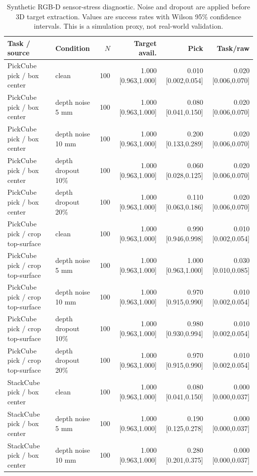 \begin{table}[t]
\centering
\caption{Synthetic RGB-D sensor-stress diagnostic. Noise and dropout are applied before 3D target extraction. Values are success rates with Wilson 95\% confidence intervals. This is a simulation proxy, not real-world validation.}
\label{tab:sensor-stress}
\small
\begin{tabular}{llrrrr}
\toprule
Task / source & Condition & $N$ & Target avail. & Pick & Task/raw \\
\midrule
PickCube pick / box center & clean & 100 & 1.000 [0.963,1.000] & 0.010 [0.002,0.054] & 0.020 [0.006,0.070] \\
PickCube pick / box center & depth noise 5 mm & 100 & 1.000 [0.963,1.000] & 0.080 [0.041,0.150] & 0.020 [0.006,0.070] \\
PickCube pick / box center & depth noise 10 mm & 100 & 1.000 [0.963,1.000] & 0.200 [0.133,0.289] & 0.020 [0.006,0.070] \\
PickCube pick / box center & depth dropout 10\% & 100 & 1.000 [0.963,1.000] & 0.060 [0.028,0.125] & 0.020 [0.006,0.070] \\
PickCube pick / box center & depth dropout 20\% & 100 & 1.000 [0.963,1.000] & 0.110 [0.063,0.186] & 0.020 [0.006,0.070] \\
\midrule
PickCube pick / crop top-surface & clean & 100 & 1.000 [0.963,1.000] & 0.990 [0.946,0.998] & 0.010 [0.002,0.054] \\
PickCube pick / crop top-surface & depth noise 5 mm & 100 & 1.000 [0.963,1.000] & 1.000 [0.963,1.000] & 0.030 [0.010,0.085] \\
PickCube pick / crop top-surface & depth noise 10 mm & 100 & 1.000 [0.963,1.000] & 0.970 [0.915,0.990] & 0.010 [0.002,0.054] \\
PickCube pick / crop top-surface & depth dropout 10\% & 100 & 1.000 [0.963,1.000] & 0.980 [0.930,0.994] & 0.010 [0.002,0.054] \\
PickCube pick / crop top-surface & depth dropout 20\% & 100 & 1.000 [0.963,1.000] & 0.970 [0.915,0.990] & 0.010 [0.002,0.054] \\
\midrule
StackCube pick / box center & clean & 100 & 1.000 [0.963,1.000] & 0.080 [0.041,0.150] & 0.000 [0.000,0.037] \\
StackCube pick / box center & depth noise 5 mm & 100 & 1.000 [0.963,1.000] & 0.190 [0.125,0.278] & 0.000 [0.000,0.037] \\
StackCube pick / box center & depth noise 10 mm & 100 & 1.000 [0.963,1.000] & 0.280 [0.201,0.375] & 0.000 [0.000,0.037] \\

\end{tabular}
\end{table}
